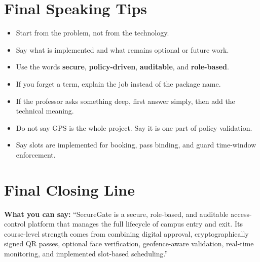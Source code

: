 \documentclass[12pt,letterpaper]{article}
\newcommand{\say}[1]{\textbf{What you can say:} ``#1''}
\begin{document}
\section{Final Speaking Tips}

\begin{itemize}
    \item Start from the problem, not from the technology.
    \item Say what is implemented and what remains optional or future work.
    \item Use the words \textbf{secure}, \textbf{policy-driven}, \textbf{auditable}, and \textbf{role-based}.
    \item If you forget a term, explain the job instead of the package name.
    \item If the professor asks something deep, first answer simply, then add the technical meaning.
    \item Do not say GPS is the whole project. Say it is one part of policy validation.
    \item Say slots are implemented for booking, pass binding, and guard time-window enforcement.
\end{itemize}

\section{Final Closing Line}

\say{SecureGate is a secure, role-based, and auditable access-control platform that manages the full lifecycle of campus entry and exit. Its course-level strength comes from combining digital approval, cryptographically signed QR passes, optional face verification, geofence-aware validation, real-time monitoring, and implemented slot-based scheduling.}
\end{document}

